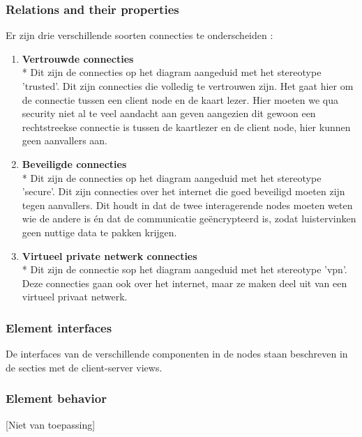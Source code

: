 \documentclass[a4paper,10pt]{article}
\begin{document}
\subsubsection{Relations and their properties}
\label{subsubsec:relations_deployment}
Er zijn drie verschillende soorten connecties te onderscheiden : 
\begin{enumerate}
 \item \textbf{Vertrouwde connecties}\\*
Dit zijn de connecties op het diagram aangeduid met het stereotype 'trusted'. Dit zijn connecties die volledig te vertrouwen zijn. Het gaat hier om de connectie tussen een client node en de kaart lezer. Hier moeten we qua security niet al te veel aandacht aan geven aangezien dit gewoon een rechtstreekse connectie is tussen de kaartlezer en de client node, hier kunnen geen aanvallers aan. 
\item \textbf{Beveiligde connecties}\\*
Dit zijn de connecties op het diagram aangeduid met het stereotype 'secure'. Dit zijn connecties over het internet die goed beveiligd moeten zijn tegen aanvallers. Dit houdt in dat de twee interagerende nodes moeten weten wie de andere is én dat de communicatie geëncrypteerd is, zodat luistervinken geen nuttige data te pakken krijgen.
\item \textbf{Virtueel private netwerk connecties}\\*
Dit zijn de connectie sop het diagram aangeduid met het stereotype 'vpn'. Deze connecties gaan ook over het internet, maar ze maken deel uit van een virtueel privaat netwerk.
\end{enumerate}

\subsubsection{Element interfaces}

De interfaces van de verschillende componenten in de nodes staan beschreven in de secties met de client-server views.

\subsubsection{Element behavior}
[Niet van toepassing]
\clearpage
\end{document}
